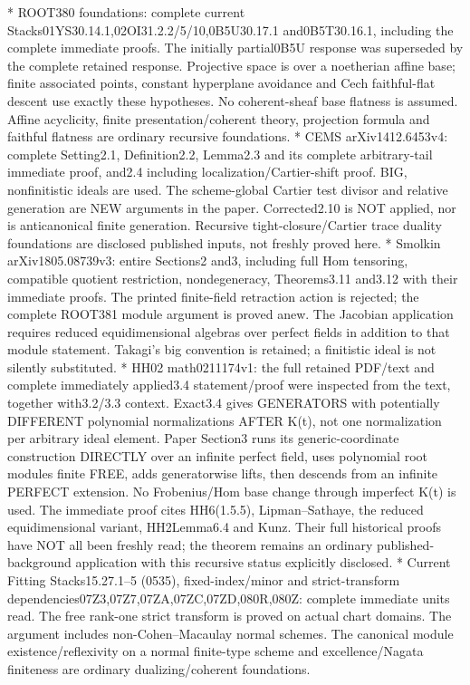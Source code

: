 \documentclass[11pt]{article}
\begin{document}
\begin{ImportedQualifiedGrant}
* ROOT380 foundations: complete current Stacks01YS30.14.1,02OI31.2.2/5/10,0B5U30.17.1 and0B5T30.16.1, including the complete immediate proofs. The initially partial0B5U response was superseded by the complete retained response. Projective space is over a noetherian affine base; finite associated points, constant hyperplane avoidance and Cech faithful-flat descent use exactly these hypotheses. No coherent-sheaf base flatness is assumed. Affine acyclicity, finite presentation/coherent theory, projection formula and faithful flatness are ordinary recursive foundations.
* CEMS arXiv1412.6453v4: complete Setting2.1, Definition2.2, Lemma2.3 and its complete arbitrary-tail immediate proof, and2.4 including localization/Cartier-shift proof. BIG, nonfinitistic ideals are used. The scheme-global Cartier test divisor and relative generation are NEW arguments in the paper. Corrected2.10 is NOT applied, nor is anticanonical finite generation. Recursive tight-closure/Cartier trace duality foundations are disclosed published inputs, not freshly proved here.
* Smolkin arXiv1805.08739v3: entire Sections2 and3, including full Hom tensoring, compatible quotient restriction, nondegeneracy, Theorems3.11 and3.12 with their immediate proofs. The printed finite-field retraction action is rejected; the complete ROOT381 module argument is proved anew. The Jacobian application requires reduced equidimensional algebras over perfect fields in addition to that module statement. Takagi's big convention is retained; a finitistic ideal is not silently substituted.
* HH02 math0211174v1: the full retained PDF/text and complete immediately applied3.4 statement/proof were inspected from the text, together with3.2/3.3 context. Exact3.4 gives GENERATORS with potentially DIFFERENT polynomial normalizations AFTER K(t), not one normalization per arbitrary ideal element. Paper Section3 runs its generic-coordinate construction DIRECTLY over an infinite perfect field, uses polynomial root modules finite FREE, adds generatorwise lifts, then descends from an infinite PERFECT extension. No Frobenius/Hom base change through imperfect K(t) is used. The immediate proof cites HH6(1.5.5), Lipman--Sathaye, the reduced equidimensional variant, HH2Lemma6.4 and Kunz. Their full historical proofs have NOT all been freshly read; the theorem remains an ordinary published-background application with this recursive status explicitly disclosed.
* Current Fitting Stacks15.27.1--5 (0535), fixed-index/minor and strict-transform dependencies07Z3,07Z7,07ZA,07ZC,07ZD,080R,080Z: complete immediate units read. The free rank-one strict transform is proved on actual chart domains. The argument includes non-Cohen--Macaulay normal schemes. The canonical module existence/reflexivity on a normal finite-type scheme and excellence/Nagata finiteness are ordinary dualizing/coherent foundations.

\end{ImportedQualifiedGrant}
\end{document}
